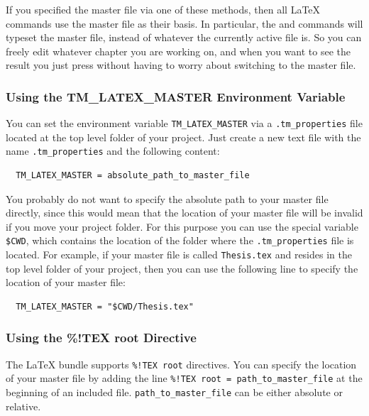 \documentclass[11pt, x11names]{article}
\begin{document}
If you specified the master file via one of these methods, then all LaTeX commands use the master file as their basis. In particular, the  and  commands will typeset the master file, instead of whatever the currently active file is. So you can freely edit whatever chapter you are working on, and when you want to see the result you just press  without having to worry about switching to the master file.

\subsubsection{Using the TM\_LATEX\_MASTER Environment Variable}
\label{sec:Using_TM_LATEX_MASTER}

You can set the environment variable \texttt{TM\_LATEX\_MASTER} via a \texttt{.tm\_properties} file located at the top level folder of your project. Just create a new text file with the name \texttt{.tm\_properties} and the following content:

\begin{verbatim}
  TM_LATEX_MASTER = absolute_path_to_master_file
\end{verbatim}

You probably do not want to specify the absolute path to your master file directly, since this would mean that the location of your master file will be invalid if you move your project folder. For this purpose you can use the special variable \texttt{\$CWD}, which contains the location of the folder where the \texttt{.tm\_properties} file is located. For example, if your master file is called \texttt{Thesis.tex} and resides in the top level folder of your project, then you can use the following line to specify the location of your master file:

\begin{verbatim}
  TM_LATEX_MASTER = "$CWD/Thesis.tex"
\end{verbatim}

\subsubsection{Using the \%!TEX root Directive}
\label{sec:Using_TM_TEX_ROOT}

The LaTeX bundle supports \texttt{\%!TEX\ root} directives. You can specify the location of your master file by adding the line \texttt{\%!TEX\ root\ =\ path\_to\_master\_file} at the beginning of an included file. \texttt{path\_to\_master\_file} can be either absolute or relative.\\
\end{document}
